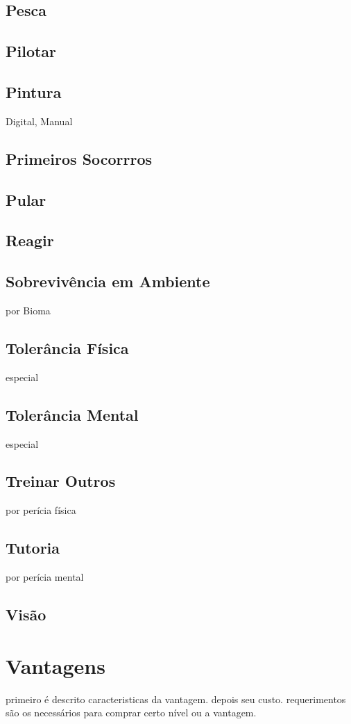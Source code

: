 \section{Pesca}
\section{Pilotar}
\section{Pintura} Digital, Manual
\section{Primeiros Socorrros}
\section{Pular}
\section{Reagir}
\section{Sobrevivência em Ambiente} por Bioma
\section{Tolerância Física} especial
\section{Tolerância Mental} especial
\section{Treinar Outros} por perícia física
\section{Tutoria} por perícia mental
\section{Visão}
%
%
%
%
%
\chapter{Vantagens}
%
%
primeiro é descrito caracteristicas da vantagem.
depois seu custo.
requerimentos são os necessários para comprar certo nível ou a vantagem.
